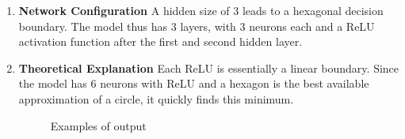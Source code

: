 \documentclass[11pt]{article}
\numberwithin{equation}{section}
\begin{document}
\begin{enumerate}
  \item{
\textbf{Network Configuration}
A hidden size of 3 leads to a hexagonal decision boundary.
The model thus has 3 layers, with 3 neurons each and a ReLU activation function after the first and second hidden layer.
}
\item{
\textbf{Theoretical Explanation}
Each ReLU is essentially a linear boundary.
Since the model has 6 neurons with ReLU and a hexagon is the best available approximation of a circle, it quickly finds this minimum.
  }

  \begin{figure}[H]
    \centering
    \hspace{0.05\textwidth} %
    \caption{Examples of output}
    \label{fig:rhrr}
  
  
  \end{figure}
\end{enumerate}
\end{document}
